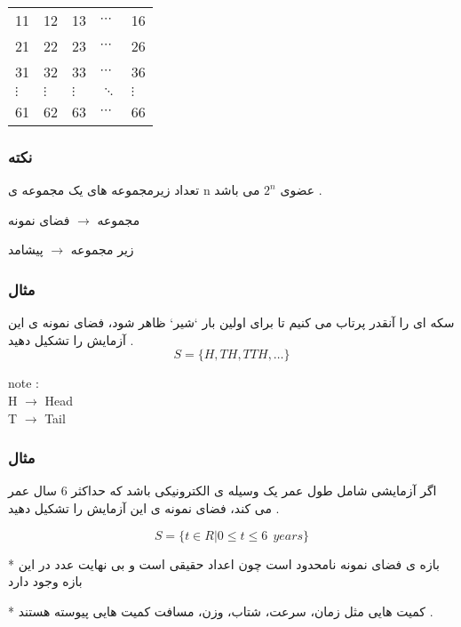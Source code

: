 \documentclass[12pt]{book}
\begin{document}
\begin{center}
\begin{latin}
\begin{tabular}{ l  l  l  l  l }
  11 & 12 & 13 & $\cdots$ & 16 \\
  21 & 22 & 23 & $\cdots$ & 26 \\
  31 & 32 & 33 & $\cdots$ & 36 \\
  $\vdots$ & $\vdots$ & $\vdots$ & $\ddots$  & $\vdots$ \\
  61 & 62 & 63 & $\cdots$ & 66 \\
\end{tabular}
\end{latin}
\end{center}



\subsubsection{نکته}
تعداد زیرمجموعه های یک مجموعه ی n عضوی $2^{n}$ می باشد .

\begin{center}
مجموعه $ \to $ فضای نمونه

زیر مجموعه  $ \to $ پیشامد
\end{center}


\subsubsection{مثال}
سکه ای را آنقدر پرتاب می کنیم تا برای اولین بار `شیر` ظاهر شود، فضای نمونه ی این آزمایش را تشکیل دهید .
$$
S = \{ H, TH, TTH, \dots \}
$$

\begin{latin}
note : \\
H $\to$ Head \\
T $\to$ Tail
\end{latin}



\subsubsection{مثال}
اگر آزمایشی شامل طول عمر یک وسیله ی الکترونیکی باشد که حداکثر 6 سال عمر می کند، فضای نمونه ی این آزمایش را تشکیل دهید .

$$
S = \{ t \in R | 0 \leq t \leq 6 \:\: years \}
$$

* بازه ی فضای نمونه نامحدود است چون اعداد حقیقی است و بی نهایت عدد در این بازه وجود دارد

* کمیت هایی مثل زمان، سرعت، شتاب، وزن، مسافت کمیت هایی پیوسته هستند .
\end{document}
